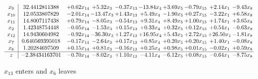 \documentclass[9pt]{article}
\begin{document}
 \[\begin{array}{c| c c@{\hskip 2pt} c@{\hskip 2pt} c@{\hskip 2pt} c@{\hskip 2pt} c@{\hskip 2pt} c@{\hskip 2pt} c@{\hskip 2pt} c@{\hskip 2pt} }
 x_{9}   &  32.4412811388 & +  0.62 x_{14} & +  5.32 x_{3} & -0.37 x_{13} & -13.84 x_{4} & +  3.69 x_{5} & -0.79 x_{15} & +  2.14 x_{1} & -9.43 x_{8}\\
 x_{10}   &  12.0533807829 & -2.01 x_{14} & -13.47 x_{3} & +  1.43 x_{13} & +  5.49 x_{4} & -1.90 x_{5} & +  0.27 x_{15} & -3.22 x_{1} & +  6.58 x_{8}\\
 x_{11}   &  14.8007117438 & +  0.79 x_{14} & -8.05 x_{3} & -0.54 x_{13} & +  9.31 x_{4} & +  8.49 x_{5} & +  1.00 x_{15} & +  1.74 x_{1} & +  3.65 x_{8}\\
 x_{2}   &  1.42348754448 & -0.05 x_{14} & -1.53 x_{3} & +  0.15 x_{13} & +  0.33 x_{4} & +  0.32 x_{5} & +  0.12 x_{15} & +  0.54 x_{1} & -0.63 x_{8}\\
 x_{12}   &  14.9430604982 & -0.92 x_{14} & -36.30 x_{3} & +  1.27 x_{13} & + 16.95 x_{4} & +  5.43 x_{5} & +  2.72 x_{15} & + 26.50 x_{1} & -1.81 x_{8}\\
 x_{7}   &  0.640569395018 & -0.17 x_{14} & -2.64 x_{3} & +  0.17 x_{13} & +  0.85 x_{4} & +  0.20 x_{5} & +  0.20 x_{15} & +  1.40 x_{1} & -0.08 x_{8}\\
 x_{6}   &  1.20284697509 & +  0.15 x_{14} & +  0.81 x_{3} & -0.16 x_{13} & +  0.25 x_{4} & +  0.98 x_{5} & +  0.01 x_{15} & -0.02 x_{1} & +  0.59 x_{8}\\
\hline
z    &  -2.38434163701 & -0.70 x_{14} & -8.02 x_{3} & +  1.10 x_{13} & -4.11 x_{4} & -6.12 x_{5} & +  0.08 x_{15} & -0.64 x_{1} & -8.75 x_{8}\\
\end{array}\]


 $ x_{13} $ enters and $ x_{6} $ leaves 
\end{document}
